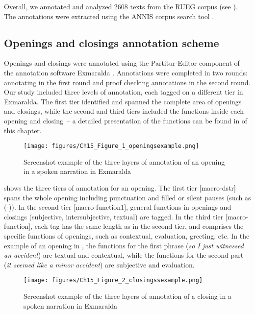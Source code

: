 \documentclass[output=paper,colorlinks,citecolor=brown]{langscibook}
\begin{document}
Overall, we annotated and analyzed 2608 texts from the RUEG corpus (see ). The annotations were extracted using the ANNIS corpus search tool \parencite{ANNIS3}. 

\subsection{Openings and closings annotation scheme}
Openings and closings were annotated using the Partitur\hyp Editor component of the annotation software Exmaralda \parencite{Exmaralda}. Annotations were completed in two rounds: annotating in the first round and proof checking annotations in the second round. Our study included three levels of annotation, each tagged on a different tier in Exmaralda. The first tier identified and spanned the complete area of openings and closings, while the second and third tiers included the functions inside each opening and closing~-- a detailed presentation of the functions can be found in  of this chapter. 

\begin{figure}
    \centering
    \texttt{[image: figures/Ch15\_Figure\_1\_openingsexample.png]}
    \caption{Screenshot example of the three layers of annotation of an opening in a spoken narration in Exmaralda}
    \label{fig:katsikaetal:openingsexample}
\end{figure}

 shows the three tiers of annotation for an opening. The first tier [macro-dstr] spans the whole opening including punctuation and filled or silent pauses (such as (-)). In the second tier [macro-function1], general functions in openings and closings (subjective, intersubjective, textual) are tagged. In the third tier [macro-function], each tag has the same length as in the second tier, and comprises the specific functions of openings, such as contextual, evaluation, greeting, etc. In the example of an opening in , the functions for the first phrase (\textit{so I just witnessed an accident}) are textual and contextual, while the functions for the second part (\textit{it seemed like a minor accident}) are subjective and evaluation.

\begin{figure}
    \centering
    \texttt{[image: figures/Ch15\_Figure\_2\_closingssexample.png]}
    \caption{Screenshot example of the three layers of annotation of a closing in a spoken narration in Exmaralda}
    \label{fig:katsikaetal:closingsexample}
\end{figure}
\end{document}
